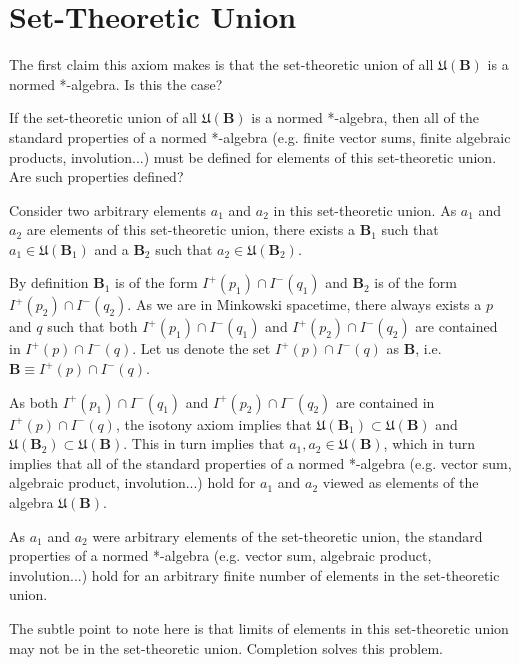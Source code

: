 \section{Set-Theoretic Union}\label{sctn:set-theoretic-union}
The first claim this axiom makes is that the set-theoretic union of all $\mathfrak{U}(\mathbf{B})$ is a normed *-algebra. Is this the case?

If the set-theoretic union of all $\mathfrak{U}(\mathbf{B})$ is a normed *-algebra, then all of the standard properties of a normed *-algebra (e.g. finite vector sums, finite algebraic products, involution...) must be defined for elements of this set-theoretic union. Are such properties defined?

Consider two arbitrary elements $a_1$ and $a_2$ in this set-theoretic union. As $a_1$ and $a_2$ are elements of this set-theoretic union, there exists a $\mathbf{B}_1$ such that $a_1 \in \mathfrak{U}(\mathbf{B}_1)$ and a $\mathbf{B}_2$ such that $a_2 \in \mathfrak{U}(\mathbf{B}_2)$.

By definition $\mathbf{B}_1$ is of the form $I^+(p_1) \cap I^-(q_1)$ and $\mathbf{B}_2$ is of the form $I^+(p_2) \cap I^-(q_2)$. As we are in Minkowski spacetime, there always exists a $p$ and $q$ such that both  $I^+(p_1) \cap I^-(q_1)$ and $I^+(p_2) \cap I^-(q_2)$ are contained in $I^+(p) \cap I^-(q)$. Let us denote the set $I^+(p) \cap I^-(q)$ as $\mathbf{B}$, i.e. $\mathbf{B} \equiv I^+(p) \cap I^-(q)$.

As both $I^+(p_1) \cap I^-(q_1)$ and $I^+(p_2) \cap I^-(q_2)$ are contained in $I^+(p) \cap I^-(q)$, the isotony axiom implies that $\mathfrak{U}(\mathbf{B}_1) \subset \mathfrak{U}(\mathbf{B})$ and $\mathfrak{U}(\mathbf{B}_2) \subset \mathfrak{U}(\mathbf{B})$. This in turn implies that $a_1, a_2 \in \mathfrak{U}(\mathbf{B})$, which in turn implies that all of the standard properties of a normed *-algebra (e.g. vector sum, algebraic product, involution...) hold for $a_1$ and $a_2$ viewed as elements of the algebra $\mathfrak{U}(\mathbf{B})$.

As $a_1$ and $a_2$ were arbitrary elements of the set-theoretic union, the standard properties of a normed *-algebra (e.g. vector sum, algebraic product, involution...) hold for an arbitrary finite number of elements in the set-theoretic union.

The subtle point to note here is that limits of elements in this set-theoretic union may not be in the set-theoretic union. Completion solves this problem.

